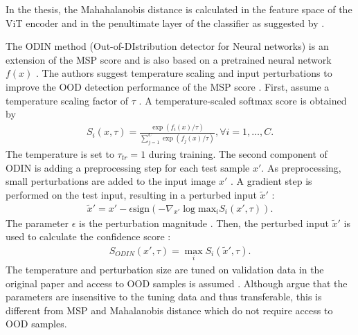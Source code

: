 In the thesis, the Mahahalanobis distance is calculated in the feature space of the ViT encoder and in the penultimate layer of the classifier as suggested by \citep{Lee2018, Michels2023}.
\par
The ODIN method (Out-of-DIstribution detector for Neural networks) is an extension of the MSP score and is also based on a pretrained neural network $f(x)$ \citep{Liang2018}.
The authors suggest temperature scaling and input perturbations to improve the OOD detection performance of the MSP score \citep{Liang2018}.
First, assume a temperature scaling factor of $\tau$ \citep{Liang2018}.
A temperature-scaled softmax score is obtained by \citep{Liang2018}
\begin{align}
	S_i(x,\tau) = \frac{\exp(f_i(x)/\tau)}{\sum_{j=1}^{C}\exp(f_j(x)/\tau)}, \forall i=1,\dots,C.
\end{align}
The temperature is set to $\tau_{tr}=1$ \citep{Liang2018} during training.
The second component of ODIN is adding a preprocessing step for each test sample $x'$.
As preprocessing, small perturbations are added to the input image $x'$ \citep{Liang2018}.
A gradient step is performed on the test input, resulting in a perturbed input $\tilde{x}'$ \citep{Liang2018}: 
\begin{align}
	\tilde{x}' = x' - \epsilon \text{sign}(-\nabla_{x'} \log \text{max}_i  S_i(x',\tau)).
\end{align}
The parameter $\epsilon$ is the perturbation magnitude \citep{Liang2018}.
Then, the perturbed input $\tilde{x}'$ is used to calculate the confidence score \citep{Liang2018}:
\begin{align}
	S_{ODIN}(x',\tau) = \max_i S_i(\tilde{x}',\tau).
\end{align}
The temperature and perturbation size are tuned on validation data in the original paper and access to OOD samples is assumed \citep{Liang2018,Hsu2020}. 
Although \citep{Liang2018} argue that the parameters are insensitive to the tuning data and thus transferable, this is different from MSP and Mahalanobis distance which do not require access to OOD samples.
